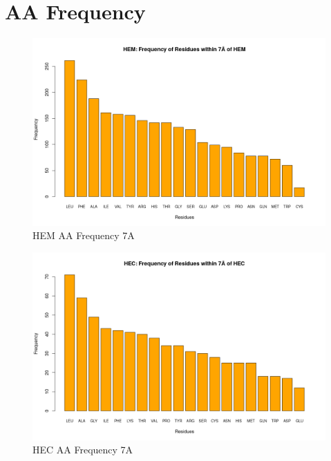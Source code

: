\section{AA Frequency}
	

	\begin{figure}
		\caption{HEM AA Frequency 7A}
		\label{figs:HEM_aafreq7}
		\includegraphics[width=1.0\textwidth]{7A/HEM_aaFreq}
	\end{figure}
	
	\begin{figure}
		\caption{HEC AA Frequency 7A}
		\label{figs:HEC_aafreq7}
		\includegraphics[width=1.0\textwidth]{7A/HEC_aaFreq}
	\end{figure}
		

